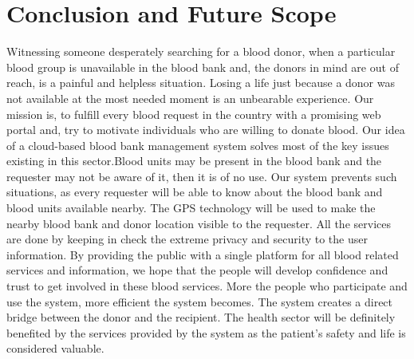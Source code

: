 \chapter{Conclusion and Future Scope}

Witnessing someone desperately searching for a blood donor, when a particular blood group is unavailable in the blood bank and, the donors in mind are out of reach, is a painful and helpless situation. Losing a life just because a donor was not available at the most needed moment is an unbearable experience. Our mission is, to fulfill every blood request in the country with a promising web portal and, try to motivate individuals who are willing to donate blood. Our idea of a cloud-based blood bank management system solves most of the key issues existing in this sector.Blood units may be present in the blood bank and the requester may not be aware of it, then it is of no use. Our system prevents such situations, as every requester will be able to know about the blood bank and blood units available nearby. The GPS technology will be used to make the nearby blood bank and donor location visible to the requester. All the services are done by keeping in check the extreme privacy and security to the user information. By providing the public with a single platform for all blood related services and information, we hope that the people will develop confidence and trust to get involved in these blood services. More the people who participate and use the system, more efficient the system becomes. The system creates a direct bridge between the donor and the recipient. The health sector will be definitely benefited by the services provided by the system as the patient's safety and life is considered valuable.